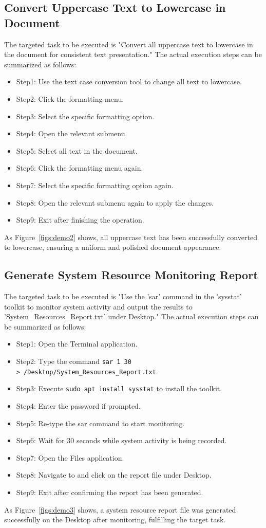 \subsection{Convert Uppercase Text to Lowercase in Document}
The targeted task to be executed is "Convert all uppercase text to lowercase in the document for consistent text presentation." The actual execution steps can be summarized as follows:
\begin{itemize}
    \item Step1: Use the text case conversion tool to change all text to lowercase.
    \item Step2: Click the formatting menu.
    \item Step3: Select the specific formatting option.
    \item Step4: Open the relevant submenu.
    \item Step5: Select all text in the document.
    \item Step6: Click the formatting menu again.
    \item Step7: Select the specific formatting option again.
    \item Step8: Open the relevant submenu again to apply the changes.
    \item Step9: Exit after finishing the operation.
\end{itemize}
As Figure~\ref{figs:demo2} shows, all uppercase text has been successfully converted to lowercase, ensuring a uniform and polished document appearance.

\subsection{Generate System Resource Monitoring Report}
The targeted task to be executed is "Use the 'sar' command in the 'sysstat' toolkit to monitor system activity and output the results to 'System\_Resources\_Report.txt' under Desktop." The actual execution steps can be summarized as follows:
\begin{itemize}
    \item Step1: Open the Terminal application.
    \item Step2: Type the command \texttt{sar 1 30 >~/Desktop/System\_Resources\_Report.txt}.
    \item Step3: Execute \texttt{sudo apt install sysstat} to install the toolkit.
    \item Step4: Enter the password if prompted.
    \item Step5: Re-type the sar command to start monitoring.
    \item Step6: Wait for 30 seconds while system activity is being recorded.
    \item Step7: Open the Files application.
    \item Step8: Navigate to and click on the report file under Desktop.
    \item Step9: Exit after confirming the report has been generated.
\end{itemize}
As Figure~\ref{figs:demo3} shows, a system resource report file was generated successfully on the Desktop after monitoring, fulfilling the target task.

